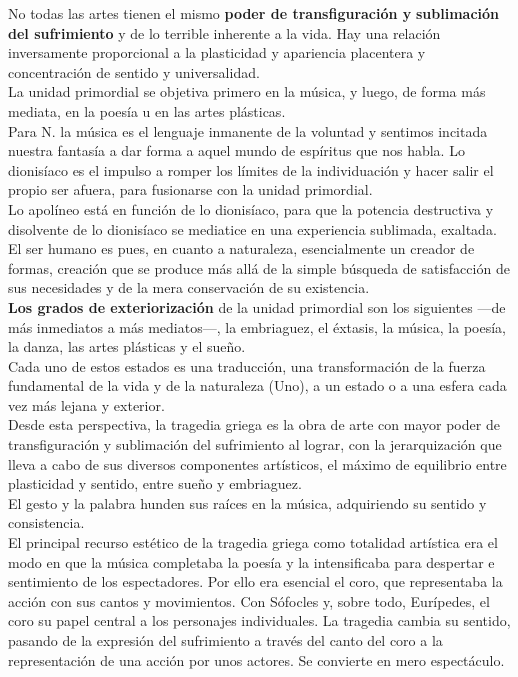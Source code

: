 \documentclass[a4paper, 10pt, twocolumn, spanish]{article}
\begin{document}
No todas las artes tienen el mismo \textbf{poder de transfiguración y}
\textbf{sublimación del sufrimiento} y de lo terrible inherente a la
vida. Hay una relación inversamente proporcional a la plasticidad y
apariencia placentera y concentración de sentido y universalidad.\\[0pt]
La unidad primordial se objetiva primero en la música, y luego, de
forma más mediata, en la poesía u en las artes plásticas.\\[0pt]
Para N. la música es el lenguaje inmanente de la voluntad y sentimos
incitada nuestra fantasía a dar forma a aquel mundo de espíritus que
nos habla. Lo dionisíaco es el impulso a romper los límites de la
individuación y hacer salir el propio ser afuera, para fusionarse con
la unidad primordial.\\[0pt]
Lo apolíneo está en función de lo dionisíaco, para que la potencia
destructiva y disolvente de lo dionisíaco se mediatice en una
experiencia sublimada, exaltada. El ser humano es pues, en cuanto a
naturaleza, esencialmente un creador de formas, creación que se
produce más allá de la simple búsqueda de satisfacción de sus
necesidades y de la mera conservación de su existencia.\\[0pt]

\textbf{Los grados de exteriorización} de la unidad primordial son los
siguientes —de más inmediatos a más mediatos—, la embriaguez, el
éxtasis, la música, la poesía, la danza, las artes plásticas y el
sueño.\\[0pt]
Cada uno de estos estados es una traducción, una transformación de la
fuerza fundamental de la vida y de la naturaleza (Uno), a un estado o
a una esfera cada vez más lejana y exterior.\\[0pt]

Desde esta perspectiva, la tragedia griega es la obra de arte con
mayor poder de transfiguración y sublimación del sufrimiento al
lograr, con la jerarquización que lleva a cabo de sus diversos
componentes artísticos, el máximo de equilibrio entre plasticidad y
sentido, entre sueño y embriaguez.\\[0pt]
El gesto y la palabra hunden sus raíces en la música, adquiriendo su
sentido y consistencia.\\[0pt]
El principal recurso estético de la tragedia griega como totalidad
artística era el modo en que la música completaba la poesía y la
intensificaba para despertar e sentimiento de los espectadores. Por
ello era esencial el coro, que representaba la acción con sus cantos y
movimientos.  Con Sófocles y, sobre todo, Eurípedes, el coro su papel
central a los personajes individuales. La tragedia cambia su sentido,
pasando de la expresión del sufrimiento a través del canto del coro a
la representación de una acción por unos actores. Se convierte en mero
espectáculo.\\[0pt]
\end{document}
